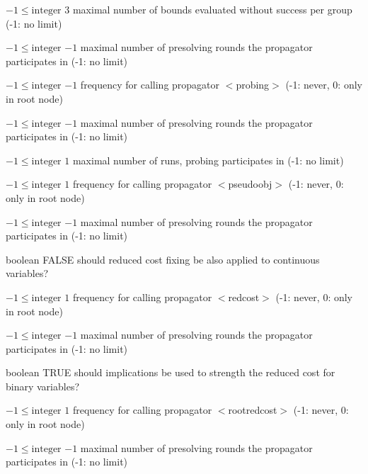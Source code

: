 %
{$-1\leq\textrm{integer}$}%
{$3$}%
{maximal number of bounds evaluated without success per group (-1: no limit)}%
{}

%
{$-1\leq\textrm{integer}$}%
{$-1$}%
{maximal number of presolving rounds the propagator participates in (-1: no limit)}%
{}

%
{$-1\leq\textrm{integer}$}%
{$-1$}%
{frequency for calling propagator $<$probing$>$ (-1: never, 0: only in root node)}%
{}

%
{$-1\leq\textrm{integer}$}%
{$-1$}%
{maximal number of presolving rounds the propagator participates in (-1: no limit)}%
{}

%
{$-1\leq\textrm{integer}$}%
{$1$}%
{maximal number of runs, probing participates in (-1: no limit)}%
{}

%
{$-1\leq\textrm{integer}$}%
{$1$}%
{frequency for calling propagator $<$pseudoobj$>$ (-1: never, 0: only in root node)}%
{}

%
{$-1\leq\textrm{integer}$}%
{$-1$}%
{maximal number of presolving rounds the propagator participates in (-1: no limit)}%
{}

%
{boolean}%
{FALSE}%
{should reduced cost fixing be also applied to continuous variables?}%
{}

%
{$-1\leq\textrm{integer}$}%
{$1$}%
{frequency for calling propagator $<$redcost$>$ (-1: never, 0: only in root node)}%
{}

%
{$-1\leq\textrm{integer}$}%
{$-1$}%
{maximal number of presolving rounds the propagator participates in (-1: no limit)}%
{}

%
{boolean}%
{TRUE}%
{should implications be used to strength the reduced cost for binary variables?}%
{}

%
{$-1\leq\textrm{integer}$}%
{$1$}%
{frequency for calling propagator $<$rootredcost$>$ (-1: never, 0: only in root node)}%
{}

%
{$-1\leq\textrm{integer}$}%
{$-1$}%
{maximal number of presolving rounds the propagator participates in (-1: no limit)}%
{}

